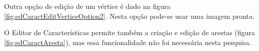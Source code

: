 Outra opção de edição de um vértice é dado na figura \ref{fig:edCaractEditVerticeOption2}. Nesta opção pode-se usar uma imagem pronta.
\begin{figure}[h]
	\centering	
\end{figure}
\FloatBarrier

O Editor de Características permite também a criação e edição de arestas (figura \ref{fig:edCaractAresta}), mas essa funcionalidade não foi necessária nesta pesquisa.
\begin{figure}[h]
	\centering	
\end{figure}
\FloatBarrier

